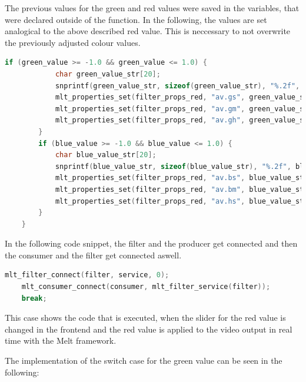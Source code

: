 \documentclass[../MasterThesis.tex]{subfiles}
\begin{document}
The previous values for the green and red values were saved in the variables, that were declared outside of the function. In the following, the values are set analogical to the above described red value. This is neccessary to not overwrite the previously adjusted colour values.
	
\begin{lstlisting}[language=c, numbers=none, columns=fullflexible]
		if (green_value >= -1.0 && green_value <= 1.0) {
			char green_value_str[20]; 
			snprintf(green_value_str, sizeof(green_value_str), "%.2f", green_value);
			mlt_properties_set(filter_props_red, "av.gs", green_value_str);
			mlt_properties_set(filter_props_red, "av.gm", green_value_str);	
			mlt_properties_set(filter_props_red, "av.gh", green_value_str);
		} 			
		if (blue_value >= -1.0 && blue_value <= 1.0) {
			char blue_value_str[20]; 
			snprintf(blue_value_str, sizeof(blue_value_str), "%.2f", blue_value);
			mlt_properties_set(filter_props_red, "av.bs", blue_value_str);
			mlt_properties_set(filter_props_red, "av.bm", blue_value_str);	
			mlt_properties_set(filter_props_red, "av.hs", blue_value_str);
		}					
	}
\end{lstlisting}

In the following code snippet, the filter and the producer get connected and then the consumer and the filter get connected aswell.


\begin{lstlisting}[language=c, numbers=none, columns=fullflexible]
	mlt_filter_connect(filter, service, 0);
	mlt_consumer_connect(consumer, mlt_filter_service(filter));
	break;			
\end{lstlisting}

This case shows the code that is executed, when the slider for the red value is changed in the frontend and the red value is applied to the video output in real time with the Melt framework.

The implementation of the switch case for the green value can be seen in the following:
\end{document}
